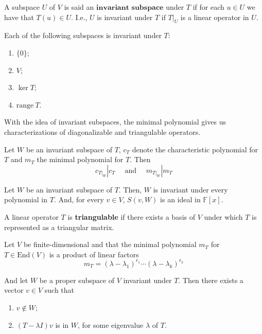 \begin{definition}
	A subspace $U$ of $V$ is said an $\textbf{invariant subspace}$ under $T$ if for each $u \in U$ we have that $T(u) \in U$. I.e., $U$ is invariant under $T$ if $T|_U$ is a linear operator in $U$.
\end{definition}

\begin{example}
	Each of the following subspaces is invariant under $T$:
	\begin{enumerate}
		\item $\{ 0 \}$;
		\item $V$;
		\item $\ker T$;
		\item $\text{range}~T$.
	\end{enumerate}
\end{example}

With the idea of invariant subspaces, the minimal polynomial gives us characterizations of diagonalizable and triangulable operators.

\begin{lemma}
	Let $W$ be an invariant subspace of $T$, $c_T$ denote the characteristic polynomial for $T$ and $m_T$ the minimal polynomial for $T$. Then
	\[
		c_{T|_{W}} | c_T \quad \text{ and } \quad m_{T|_{W}} | m_T
	\]
\end{lemma}


\begin{lemma}
	Let $W$ be an invariant subspace of $T$. Then, $W$ is invariant under every polynomial in $T$. And, for every $v \in V$, $S(v, W)$ is an ideal in $\mathbb{F}[x]$.
\end{lemma}

\begin{definition}[Triangulable]
	A linear operator $T$ is \textbf{triangulable} if there exists a basis of $V$ under which $T$ is represented as a triangular matrix.
\end{definition}

\begin{lemma}
	Let $V$ be finite-dimensional and that the minimal polynomial $m_T$ for $T \in \text{End}(V)$ is a product of linear factors 
	\[
		m_T = (\lambda - \lambda_1)^{r_1} \cdots (\lambda - \lambda_k)^{r_k}
	\]

	And let $W$ be a proper subspace of $V$ invariant under $T$. Then there exists a vector $v \in V$ such that
	\begin{enumerate}
		\item $v \notin W$;
		\item $(T - \lambda I) v$ is in $W$, for some eigenvalue $\lambda$ of $T$.
	\end{enumerate}
\end{lemma}

